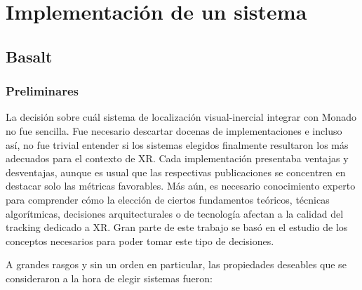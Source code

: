 \documentclass[ twoside,openright,titlepage,numbers=noenddot,%
                headinclude,footinclude,cleardoublepage=empty,abstract=on,
                BCOR=-5mm,paper=a4,fontsize=11pt
                ]{scrreprt}
\begin{document}
\hypertarget{implementaciuxf3n-de-un-sistema}{%
\part{Implementación de un
sistema}\label{implementaciuxf3n-de-un-sistema}}

\hypertarget{basalt}{%
\chapter{Basalt}\label{basalt}}

\hypertarget{preliminares-1}{%
\section{Preliminares}\label{preliminares-1}}

La decisión sobre cuál sistema de localización visual-inercial integrar
con Monado no fue sencilla. Fue necesario descartar docenas de
implementaciones e incluso así, no fue trivial entender si los sistemas
elegidos finalmente resultaron los más adecuados para el contexto de XR.
Cada implementación presentaba ventajas y desventajas, aunque es usual
que las respectivas publicaciones se concentren en destacar solo las
métricas favorables. Más aún, es necesario conocimiento experto para
comprender cómo la elección de ciertos fundamentos teóricos, técnicas
algorítmicas, decisiones arquitecturales o de tecnología afectan a la
calidad del tracking dedicado a XR. Gran parte de este trabajo se basó
en el estudio de los conceptos necesarios para poder tomar este tipo de
decisiones.

A grandes rasgos y sin un orden en particular, las propiedades deseables
que se consideraron a la hora de elegir sistemas fueron:
\end{document}
